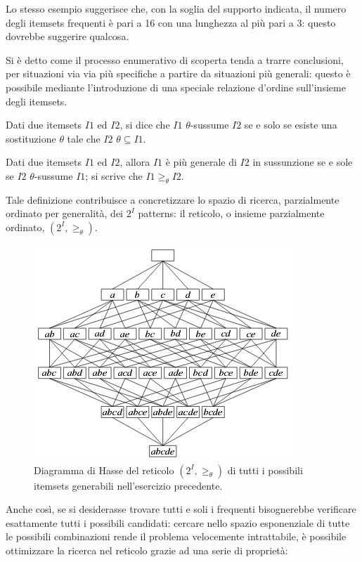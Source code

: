 Lo stesso esempio suggerisce che, con la soglia del supporto indicata, il numero degli itemsets frequenti {\`e} pari a 16 con una lunghezza al pi{\`u} pari a 3: questo dovrebbe suggerire qualcosa.

Si {\`e} detto come il processo enumerativo di scoperta tenda a trarre conclusioni, per situazioni via via pi{\`u} specifiche a partire da situazioni pi{\`u} generali: questo {\`e} possibile mediante l'introduzione di una speciale relazione d'ordine sull'insieme degli itemsets.

\begin{defn}
Dati due itemsets \( I1 \) ed \( I2 \), si dice che \( I1 \) $\theta$-sussume \( I2 \) se e solo se esiste una sostituzione $\theta$ tale che \( I2 \) $\theta \subseteq I1$.
\end{defn}

\begin{defn}
Dati due itemsets \( I1 \) ed \( I2 \), allora \( I1 \) {\`e} pi{\`u} generale di \( I2 \) in sussunzione se e sole se \( I2 \) $\theta$-sussume $I1$; si scrive che $I1 \geq_{\theta} I2$.
\end{defn}

Tale definizione contribuisce a concretizzare lo spazio di ricerca, parzialmente ordinato per generalit{\`a}, dei $2^I$ patterns: il reticolo, o insieme parzialmente ordinato, $(2^I, \geq_{\theta})$.

\begin{figure}\centering
\label{img:8.2}
\includegraphics[scale=0.65]{img/reticolo-itemsets}
\caption{Diagramma di Hasse del reticolo $(2^I, \geq_{\theta})$ di tutti i possibili itemsets generabili nell'esercizio precedente.}
\end{figure}

Anche cos{\`i}, se si desiderasse trovare tutti e soli i frequenti bisognerebbe verificare esattamente tutti i possibili candidati: cercare nello spazio esponenziale di tutte le possibili combinazioni rende il problema velocemente intrattabile, {\`e} possibile ottimizzare la ricerca nel reticolo grazie ad una serie di propriet{\`a}:

